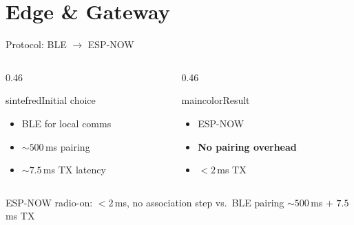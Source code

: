 \section{Edge \& Gateway}

\begin{frame}{Protocol: BLE $\rightarrow$ ESP-NOW}
\begin{columns}[T,onlytextwidth]
\begin{column}{0.46\textwidth}
  \begin{colorblock}[white]{sintefred}{Initial choice}
  \large
  \begin{itemize}
    \item BLE for local comms
    \item $\sim500$\,ms pairing
    \item $\sim7.5$\,ms TX latency
  \end{itemize}
  \end{colorblock}
\end{column}
\begin{column}{0.46\textwidth}
  \begin{colorblock}[white]{maincolor}{Result}
  \large
  \begin{itemize}
    \item ESP-NOW
    \item \textbf{No pairing overhead}
    \item $<2$\,ms TX
  \end{itemize}
  \end{colorblock}
\end{column}
\end{columns}
\vspace{0.4cm}
\centering
\small ESP-NOW radio-on: $<2$\,ms, no association step vs.\ BLE pairing ${\sim}500$\,ms $+$ $7.5$\,ms TX
\end{frame}

